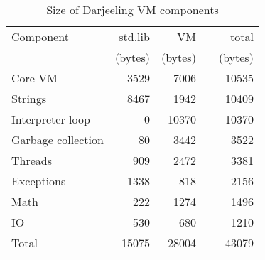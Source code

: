 \begin{table}
\caption{Size of Darjeeling VM components}
\label{tab-vm-size}
    \begin{tabular}{lrrcr} %
    \toprule
    Component             & std.lib                   & VM                   & & total \\
                          & (bytes)                   & (bytes)              & & (bytes)  \\
    \midrule
    \midrule
    Core VM               &  3529                     &  7006                & &           10535 \\
    Strings               &  8467                     &  1942                & &           10409 \\
    Interpreter loop      &     0                     & 10370                & &           10370 \\
    Garbage collection    &    80                     &  3442                & &            3522 \\
    Threads               &   909                     &  2472                & &            3381 \\
    Exceptions            &  1338                     &   818                & &            2156 \\
    Math                  &   222                     &  1274                & &            1496 \\
    IO                    &   530                     &   680                & &            1210 \\
    Total                 & 15075                     & 28004                & &           43079 \\
    \bottomrule
    \end{tabular}
\end{table}
